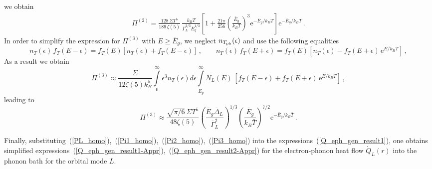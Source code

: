 \documentclass[prx,twocolumn,aps,superscriptaddress,showpacs,amsmath,amssymb,footnoteinbib]{revtex4-1}
\begin{document}
we obtain
%
\begin{gather}\label{Pi2_res}
    \Pi^{(2)} = \frac{128\, \Sigma T^5}{189\, \zeta(5)}\,
        \frac{k_B T}{\bar{\Gamma}_L^{2/3} \bar{E}_q^{1/3}} \left[ 1 +
        \frac{21 \pi}{256} \left( \frac{\bar{E}_g}{k_B T} \right)^3
        \mathrm{e}^{-\bar{E}_g / k_B T} \right] \mathrm{e}^{-\bar{E}_g / k_B T} \,.
\end{gather}
%
In order to simplify the expression for $\Pi^{(3)}$ with $E \ge \bar{E}_g$, we neglect $n_{T_{\rm ph}}(\epsilon)$ and use the following equalities
$$
    n_T(\epsilon)\, f_T(E-\epsilon) = f_T(E)\left[ n_T(\epsilon) + f_T(E-\epsilon)\right]\,, \qquad
    n_T(\epsilon)\, f_T(E+\epsilon) = f_T(E)\left[ n_T(\epsilon) - f_T(E+\epsilon)\,
        \mathrm{e}^{E/k_B T} \right] \,,
$$
As a result we obtain
%
\begin{equation}
   \Pi^{(3)} \approx \frac{\Sigma}{12 \zeta(5) k_B^5} \int\limits_{0}^{\infty}\epsilon^3
        n_T(\epsilon) d\epsilon \int\limits_{\bar{E}_g}^{\infty}
             \bar{N}_L(E)\,\left[ f_T(E-\epsilon) + f_T(E+\epsilon)\,
        \mathrm{e}^{E/k_B T} \right]\,, \label{Pi2_homo}
\end{equation}
%
leading to
%
\begin{equation}
   \Pi^{(3)} \approx \frac{\sqrt{\pi/6}\, \Sigma T^5}{48 \zeta(5)}
     \left( \frac{\bar{E}_g \bar{\Delta}_L}{\bar{\Gamma}_L^2}\right)^{1/3}
    \left( \frac{\bar{E}_g}{k_B \bar{T}} \right)^{7/2} \mathrm{e}^{-\bar{E}_g / k_B \bar{T}} \,. \label{Pi3_homo}
\end{equation}
%

Finally, substituting~(\ref{PL_homo}),~(\ref{Pi1_homo}),~(\ref{Pi2_homo}),~(\ref{Pi3_homo})
into the expressions~(\ref{Q_eph_gen_result1}), one obtains
simplified expressions~(\ref{Q_eph_gen_result1-Appr}),~(\ref{Q_eph_gen_result2-Appr}) for
the electron-phonon heat flow $\dot{Q}_L(r)$ into the phonon bath
for the orbital mode $L$.

\twocolumngrid
\end{document}
